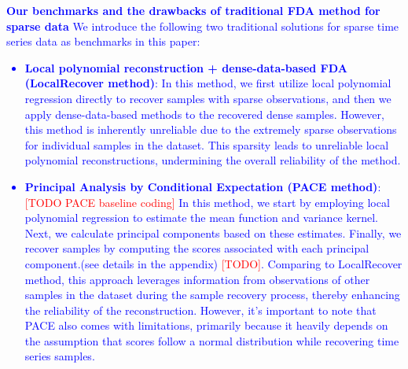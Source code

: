 \documentclass{article}
\begin{document}
\textcolor{blue}{
\textbf{Our benchmarks and the drawbacks of traditional FDA method for sparse data}
We introduce the following two traditional solutions for sparse time series data as benchmarks in this paper:
\begin{itemize}
  \item \textbf{Local polynomial reconstruction + dense-data-based FDA (LocalRecover method)}: 
  In this method, we first utilize local polynomial regression directly to recover samples with sparse observations, 
  and then we apply dense-data-based methods to the recovered dense samples. 
  However, this method is inherently unreliable due to the extremely sparse observations for individual samples in the dataset. 
  This sparsity leads to unreliable local polynomial reconstructions, 
  undermining the overall reliability of the method.
  \item \textbf{Principal Analysis by Conditional Expectation (PACE method)}: 
  \textcolor{red}{[TODO PACE baseline coding]} 
  In this method, we start by employing local polynomial regression to estimate the mean function and variance kernel. 
  Next, we calculate principal components based on these estimates. 
  Finally, we recover samples by computing the scores associated with each principal component.(see details in the appendix)
  \textcolor{red}{[TODO]}.
  Comparing to LocalRecover method, this approach leverages information from observations of other samples in the dataset during the sample recovery process, 
  thereby enhancing the reliability of the reconstruction. 
  However, it's important to note that PACE also comes with limitations, primarily because it heavily depends on the assumption that scores follow a normal distribution while recovering time series samples.
\end{itemize}
}
\end{document}
